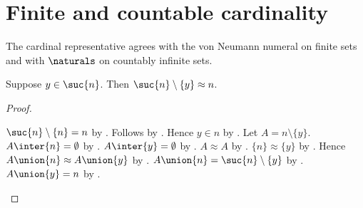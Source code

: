 




\section{Finite and countable cardinality}

The cardinal representative agrees with the von Neumann numeral on finite
sets and with $\naturals$ on countably infinite sets.

\begin{proposition}\label{successor_remove_element_equinum}
    Suppose $y\in\suc{n}$.
    Then $\suc{n}\setminus\{y\}\approx n$.
\end{proposition}
\begin{proof}
    \begin{byCase}
            $\suc{n}\setminus\{n\}=n$
                by .
            Follows by .
            Hence $y\in n$ by .
            Let $A=n\setminus\{y\}$.
            $A\inter\{n\}=\emptyset$
                by
                .
            $A\inter\{y\}=\emptyset$
                by .
            $A\approx A$ by .
            $\{n\}\approx\{y\}$ by .
            Hence $A\union\{n\}\approx A\union\{y\}$
                by .
            $A\union\{n\}=\suc{n}\setminus\{y\}$
                by
                .
            $A\union\{y\}=n$
                by
                .
    \end{byCase}
\end{proof}

